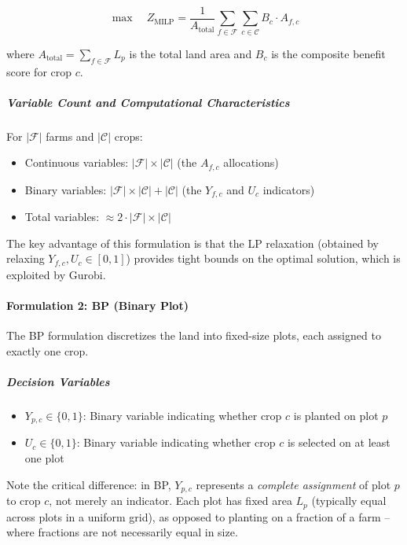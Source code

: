 \documentclass{oqireport}
\begin{document}
\begin{equation}
\max \quad Z_{\text{MILP}} = \frac{1}{A_{\text{total}}} \sum_{f \in \mathcal{F}} \sum_{c \in \mathcal{C}} B_c \cdot A_{f,c}
\label{eq:MILP_objective}
\end{equation}

where $A_{\text{total}} = \sum_{f \in \mathcal{F}} L_p$ is the total land area and $B_c$ is the composite benefit score for crop $c$.

\subparagraph{Variable Count and Computational Characteristics}

For $|\mathcal{F}|$ farms and $|\mathcal{C}|$ crops:
\begin{itemize}
    \item Continuous variables: $|\mathcal{F}| \times |\mathcal{C}|$ (the $A_{f,c}$ allocations)
    \item Binary variables: $|\mathcal{F}| \times |\mathcal{C}| + |\mathcal{C}|$ (the $Y_{f,c}$ and $U_c$ indicators)
    \item Total variables: $\approx 2 \cdot |\mathcal{F}| \times |\mathcal{C}|$
\end{itemize}

The key advantage of this formulation is that the LP relaxation (obtained by relaxing $Y_{f,c}, U_c \in [0,1]$) provides tight bounds on the optimal solution, which is exploited by Gurobi.

\paragraph{Formulation 2: BP (Binary Plot)}

The BP formulation discretizes the land into fixed-size plots, each assigned to exactly one crop.

\subparagraph{Decision Variables}

\begin{itemize}
    \item $Y_{p,c} \in \{0,1\}$: Binary variable indicating whether crop $c$ is planted on plot $p$
    \item $U_c \in \{0,1\}$: Binary variable indicating whether crop $c$ is selected on at least one plot
\end{itemize}

Note the critical difference: in BP, $Y_{p,c}$ represents a \emph{complete assignment} of plot $p$ to crop $c$, not merely an indicator. Each plot has fixed area $L_p$ (typically equal across plots in a uniform grid), as opposed to planting on a fraction of a farm -- where fractions are not necessarily equal in size.
\end{document}
